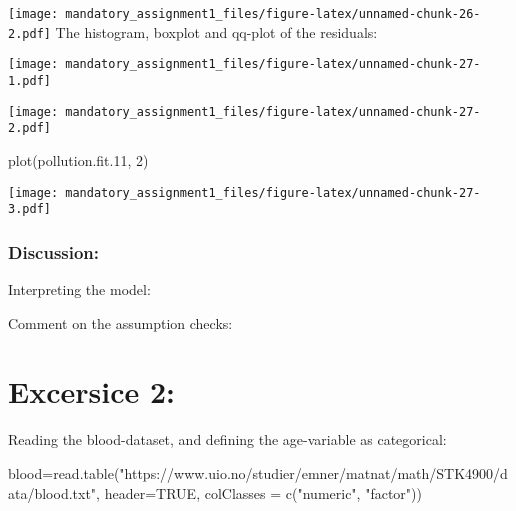 \documentclass[
]{article}
\newenvironment{Shaded}{\begin{snugshade}}{\end{snugshade}}
\newcommand{\AttributeTok}[1]{\textcolor[rgb]{0.77,0.63,0.00}{#1}}
\newcommand{\ConstantTok}[1]{\textcolor[rgb]{0.00,0.00,0.00}{#1}}
\newcommand{\DecValTok}[1]{\textcolor[rgb]{0.00,0.00,0.81}{#1}}
\newcommand{\FloatTok}[1]{\textcolor[rgb]{0.00,0.00,0.81}{#1}}
\newcommand{\FunctionTok}[1]{\textcolor[rgb]{0.00,0.00,0.00}{#1}}
\newcommand{\NormalTok}[1]{#1}
\newcommand{\OtherTok}[1]{\textcolor[rgb]{0.56,0.35,0.01}{#1}}
\newcommand{\SpecialCharTok}[1]{\textcolor[rgb]{0.00,0.00,0.00}{#1}}
\newcommand{\StringTok}[1]{\textcolor[rgb]{0.31,0.60,0.02}{#1}}
\begin{document}
\texttt{[image: mandatory\_assignment1\_files/figure-latex/unnamed-chunk-26-2.pdf]}
The histogram, boxplot and qq-plot of the residuals:

\begin{Shaded}
\end{Shaded}

\texttt{[image: mandatory\_assignment1\_files/figure-latex/unnamed-chunk-27-1.pdf]}

\begin{Shaded}
\end{Shaded}

\texttt{[image: mandatory\_assignment1\_files/figure-latex/unnamed-chunk-27-2.pdf]}

\begin{Shaded}
\begin{Highlighting}[]
\FunctionTok{plot}\NormalTok{(pollution.fit}\FloatTok{.11}\NormalTok{, }\DecValTok{2}\NormalTok{)}
\end{Highlighting}
\end{Shaded}

\texttt{[image: mandatory\_assignment1\_files/figure-latex/unnamed-chunk-27-3.pdf]}

\hypertarget{discussion-2}{%
\subsubsection{Discussion:}\label{discussion-2}}

Interpreting the model:

Comment on the assumption checks:

\hypertarget{excersice-2}{%
\section{Excersice 2:}\label{excersice-2}}

Reading the blood-dataset, and defining the age-variable as categorical:

\begin{Shaded}
\begin{Highlighting}[]
\NormalTok{blood}\OtherTok{=}\FunctionTok{read.table}\NormalTok{(}\StringTok{"https://www.uio.no/studier/emner/matnat/math/STK4900/data/blood.txt"}\NormalTok{, }\AttributeTok{header=}\ConstantTok{TRUE}\NormalTok{, }\AttributeTok{colClasses =} \FunctionTok{c}\NormalTok{(}\StringTok{"numeric"}\NormalTok{, }\StringTok{"factor"}\NormalTok{))}
\end{Highlighting}
\end{Shaded}
\end{document}
